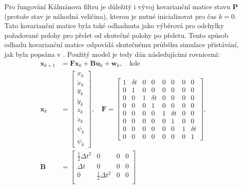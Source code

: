         Pro fungování Kálmánova filtru je důležitý i vývoj kovarianční matice stavu $\mathbf{P}$ (protože stav je náhodná veličina), kterou je nutné inicializovat pro čas $k=0$. Tato kovarianční matice byla také odhadnuta jako výběrová pro odchylky požadované polohy pro přelet od skutečné polohy po přeletu. Tento způsob odhadu kovarianční matice odpovídá skutečnému průběhu simulace přistávání, jak byla popsána v . Použitý model je tedy dán následujícími rovnicemi:
        \begin{align}
            \mathbf{x}_{k+1} &= \mathbf{Fx}_k + \mathbf{Bu}_k + \mathbf{w}_k,\quad\mathrm{kde} \label{eq:kalmanx} \\
            \mathbf{x}_k &= \begin{bmatrix}
                x_k \\ \dot x_k \\ y_k \\ \dot y_k \\ z_k \\ \dot z_k \\ \psi_k \\ \dot\psi_k
            \end{bmatrix}, \quad \mathbf{F} = \begin{bmatrix}
                1 & \delta t & 0 &        0 & 0 & 0        & 0 & 0 \\
                0 & 1        & 0 &        0 & 0 & 0        & 0 & 0 \\
                0 & 0        & 1 & \delta t & 0 & 0        & 0 & 0 \\
                0 & 0        & 0 & 1        & 0 & 0        & 0 & 0 \\
                0 & 0        & 0 & 0        & 1 & \delta t & 0 & 0 \\
                0 & 0        & 0 & 0        & 0 & 1        & 0 & 0 \\
                0 & 0        & 0 & 0        & 0 & 0        & 1 & \delta t\\
                0 & 0        & 0 & 0        & 0 & 0        & 0 & 1
            \end{bmatrix}, \quad \\
            \mathbf{B} &= \begin{bmatrix}
                \frac{1}{2}\Delta t^2 & 0 & 0 & 0 \\
                \Delta t & 0 & 0 & 0 \\
                0 & \frac{1}{2}\Delta t^2 & 0 & 0 \\

\end{bmatrix}
\end{align}
